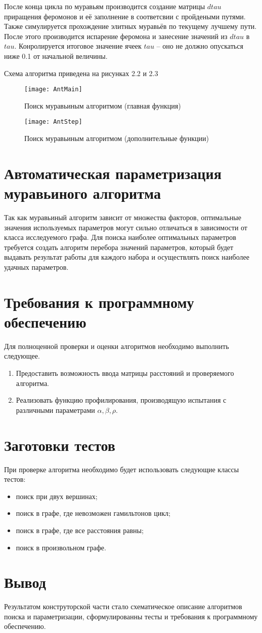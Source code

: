 После конца цикла по муравьям производится создание матрицы $dtau$ приращения феромонов и её заполнение в соответсвии с пройдеными путями. Также симулируется прохождение элитных муравьёв по текущему лучшему пути. После этого производится испарение феромона и занесение значений из $dtau$ в $tau$. Конролируется итоговое значение ячеек $tau$ -- оно не должно опускаться ниже 0.1 от начальной величины.

Схема алгоритма приведена на рисунках 2.2 и 2.3
\begin{figure}[h]
	\begin{center}
		{\texttt{[image: AntMain]}}
		\caption{Поиск муравьиным алгоритмом (главная функция)}
	\end{center}
\end{figure}
\begin{figure}[h]
	\begin{center}
		{\texttt{[image: AntStep]}}
		\caption{Поиск муравьиным алгоритмом (дополнительные функции)}
	\end{center}
\end{figure}

\section{Автоматическая параметризация муравьиного алгоритма}
Так как муравьиный алгоритм зависит от множества факторов, оптимальные значения используемых параметров могут сильно отличаться в зависимости от класса исследуемого графа. Для поиска наиболее оптимальных параметров требуется создать алгоритм перебора значений параметров, который будет выдавать результат работы для каждого набора и осуществлять поиск наиболее удачных параметров.


\section{Требования к программному обеспечению}
Для полноценной проверки и оценки алгоритмов необходимо выполнить следующее.
\begin{enumerate}
	\item Предоставить возможность ввода матрицы расстояний и проверяемого алгоритма.
	\item Реализовать функцию профилирования, производящую испытания с различными параметрами $\alpha, \beta, \rho$.
\end{enumerate}


\section{Заготовки тестов}
При проверке алгоритма необходимо будет использовать следующие классы тестов:
\begin{itemize}
	\item поиск при двух вершинах;
	\item поиск в графе, где невозможен гамильтонов цикл;
	\item поиск в графе, где все расстояния равны;
	\item поиск в произвольном графе.
\end{itemize}

\section*{Вывод}
Результатом конструторской части стало схематическое описание алгоритмов поиска и параметризации, сформулированны тесты и требования к программному обеспечению.


